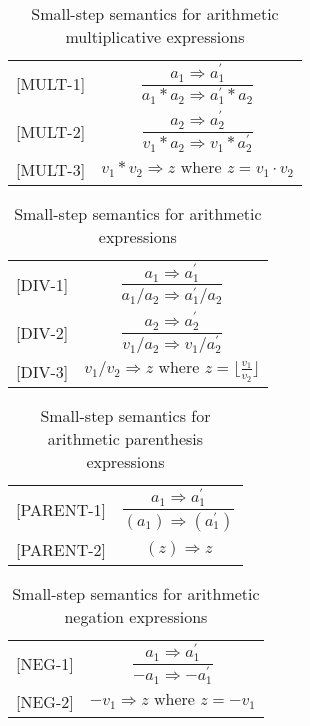 \begin{table}[H]
    \centering
    \begin{longtable}[c] { r c }
        
        [MULT-1] & \( \dfrac{a_1 \Rightarrow a^{'}_{1}}{a_1 * a_2 \Rightarrow a^{'}_{1} * a_2} \) \\
        
        [MULT-2] & \( \dfrac{a_2 \Rightarrow a^{'}_{2}}{v_1 * a_2 \Rightarrow v_1 * a^{'}_{2}} \) \\
        
        [MULT-3] & \(v_1 * v_2 \Rightarrow z \text{ where } z = v_1 \cdot v_2\) \\
        
    \end{longtable}
    \caption{Small-step semantics for arithmetic multiplicative expressions}\label{tab:sss_aud}
\end{table}
\begin{table}[H]
    \centering
    \begin{longtable}[c] { r c }
        
        [DIV-1] & \( \dfrac{a_1 \Rightarrow a^{'}_{1}}{a_1 / a_2 \Rightarrow a^{'}_{1} / a_2} \) \\
        
        [DIV-2] & \( \dfrac{a_2 \Rightarrow a^{'}_{2}}{v_1 / a_2 \Rightarrow v_1 / a^{'}_{2}} \) \\
        
        [DIV-3] & \(v_1 / v_2 \Rightarrow z \text{ where } z = \lfloor\frac{v_1} {v_2}\rfloor\) \\
        
    \end{longtable}
    \caption{Small-step semantics for arithmetic expressions}\label{tab:sss_aud}
\end{table}
        \begin{table}[H]
    \centering
    \begin{longtable}[c] { r c }
        [PARENT-1] & \( \dfrac{a_1 \Rightarrow a^{'}_{1}}{(a_1) \Rightarrow (a^{'}_{1})} \) \\
        
        [PARENT-2] & \( (z) \Rightarrow z \) \\
        
    \end{longtable}
    \caption{Small-step semantics for arithmetic parenthesis expressions}\label{tab:sss_aud}
\end{table}
\begin{table}[H]
    \centering
    \begin{longtable}[c] { r c }
        
        [NEG-1] & \( \dfrac{a_1 \Rightarrow a^{'}_{1}}{-a_1 \Rightarrow -a^{'}_{1}} \) \\
        
        [NEG-2] & \( -v_1 \Rightarrow z \text{ where } z = -v_1 \)\\
        
    \end{longtable}
    \caption{Small-step semantics for arithmetic negation expressions}\label{tab:sss_aud}
\end{table}

